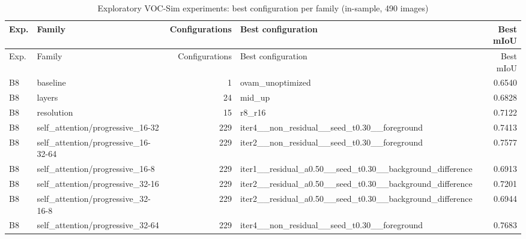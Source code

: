 {\scriptsize\setlength{\tabcolsep}{3pt}
\begin{longtable}{>{\raggedright\arraybackslash}p{1.40cm}>{\raggedright\arraybackslash}p{3.67cm}r>{\raggedright\arraybackslash}p{5.74cm}r}
\caption{Exploratory VOC-Sim experiments: best configuration per family (in-sample, 490 images)}\label{tab:b_family_winners}\\
\toprule
Exp. & Family & Configurations & Best configuration & Best mIoU \\
\midrule
\endfirsthead
\toprule
Exp. & Family & Configurations & Best configuration & Best mIoU \\
\midrule
\endhead
B8 & baseline & 1 & ovam\_\allowbreak{}unoptimized & 0.6540 \\
B8 & layers & 24 & mid\_\allowbreak{}up & 0.6828 \\
B8 & resolution & 15 & r8\_\allowbreak{}r16 & 0.7122 \\
B8 & self\_\allowbreak{}attention/\allowbreak{}progressive\_\allowbreak{}16-32 & 229 & iter4\_\allowbreak{}\_\allowbreak{}non\_\allowbreak{}residual\_\allowbreak{}\_\allowbreak{}seed\_\allowbreak{}t0.30\_\allowbreak{}\_\allowbreak{}foreground & 0.7413 \\
B8 & self\_\allowbreak{}attention/\allowbreak{}progressive\_\allowbreak{}16-32-64 & 229 & iter2\_\allowbreak{}\_\allowbreak{}non\_\allowbreak{}residual\_\allowbreak{}\_\allowbreak{}seed\_\allowbreak{}t0.30\_\allowbreak{}\_\allowbreak{}foreground & 0.7577 \\
B8 & self\_\allowbreak{}attention/\allowbreak{}progressive\_\allowbreak{}16-8 & 229 & iter1\_\allowbreak{}\_\allowbreak{}residual\_\allowbreak{}a0.50\_\allowbreak{}\_\allowbreak{}seed\_\allowbreak{}t0.30\_\allowbreak{}\_\allowbreak{}background\_\allowbreak{}difference & 0.6913 \\
B8 & self\_\allowbreak{}attention/\allowbreak{}progressive\_\allowbreak{}32-16 & 229 & iter2\_\allowbreak{}\_\allowbreak{}residual\_\allowbreak{}a0.50\_\allowbreak{}\_\allowbreak{}seed\_\allowbreak{}t0.30\_\allowbreak{}\_\allowbreak{}background\_\allowbreak{}difference & 0.7201 \\
B8 & self\_\allowbreak{}attention/\allowbreak{}progressive\_\allowbreak{}32-16-8 & 229 & iter2\_\allowbreak{}\_\allowbreak{}residual\_\allowbreak{}a0.50\_\allowbreak{}\_\allowbreak{}seed\_\allowbreak{}t0.30\_\allowbreak{}\_\allowbreak{}background\_\allowbreak{}difference & 0.6944 \\
B8 & self\_\allowbreak{}attention/\allowbreak{}progressive\_\allowbreak{}32-64 & 229 & iter4\_\allowbreak{}\_\allowbreak{}non\_\allowbreak{}residual\_\allowbreak{}\_\allowbreak{}seed\_\allowbreak{}t0.30\_\allowbreak{}\_\allowbreak{}foreground & 0.7683 \\

\end{longtable}}
